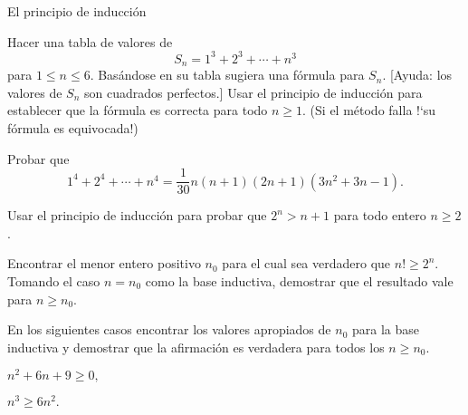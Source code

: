 \begin{section}{El principio de inducción}
\begin{enumex}
\item Hacer una tabla de valores de
$$
S_n = 1^3+2^3+\cdots +n^3
$$
para $1 \le n\le 6$. Basándose en su tabla sugiera una fórmula para $S_n$. [Ayuda: los valores de $S_n$ son cuadrados perfectos.] Usar el principio de inducción para establecer que la fórmula es correcta para todo $n\ge 1$. (Si el método falla !`su fórmula es equivocada!)

\item Probar que
$$
1^4+2^4+\cdots+n^4= \frac{1}{30}n(n+1)(2n+1)(3n^2+3n-1).
$$
\item Usar el principio de inducción para probar que $2^n>n+1$ para todo entero $n\ge2$.

\item Encontrar el menor entero positivo $n_0$ para el cual sea verdadero que $n! \ge 2^n$. Tomando el caso $n=n_0$ como la base inductiva, demostrar que el resultado vale para $n\ge n_0$.

\item En los siguientes casos encontrar los valores apropiados de $n_0$ para la base inductiva y demostrar que la afirmación es verdadera
para todos los $n\ge n_0$.
\begin{enumex}
    \item $n^2 +6n + 9 \ge 0,$
    \item $n^3 \ge 6n^2.$
\end{enumex}
\end{enumex}
\end{section}